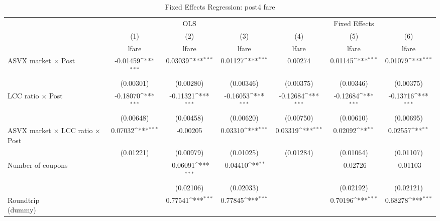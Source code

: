 \begin{table}[htbp]\centering
\def\sym#1{\ifmmode^{#1}\else\(^{#1}\)\fi}
\caption{Fixed Effects Regression: post4 fare \label{anyols\_post4\_fare}}
\begin{tabular}{l*{6}{c}}
\toprule
                    &\multicolumn{3}{c}{OLS}                                          &\multicolumn{3}{c}{Fixed Effects}                                \\\cmidrule(lr){2-4}\cmidrule(lr){5-7}
                    &\multicolumn{1}{c}{(1)}&\multicolumn{1}{c}{(2)}&\multicolumn{1}{c}{(3)}&\multicolumn{1}{c}{(4)}&\multicolumn{1}{c}{(5)}&\multicolumn{1}{c}{(6)}\\
                    &\multicolumn{1}{c}{lfare}&\multicolumn{1}{c}{lfare}&\multicolumn{1}{c}{lfare}&\multicolumn{1}{c}{lfare}&\multicolumn{1}{c}{lfare}&\multicolumn{1}{c}{lfare}\\
\midrule
ASVX market $\times$ Post&    -0.01459\sym{***}&     0.03039\sym{***}&     0.01127\sym{***}&     0.00274         &     0.01145\sym{***}&     0.01079\sym{***}\\
                    &   (0.00301)         &   (0.00280)         &   (0.00346)         &   (0.00375)         &   (0.00346)         &   (0.00375)         \\
\addlinespace
LCC ratio $\times$ Post&    -0.18070\sym{***}&    -0.11321\sym{***}&    -0.16053\sym{***}&    -0.12684\sym{***}&    -0.12684\sym{***}&    -0.13716\sym{***}\\
                    &   (0.00648)         &   (0.00458)         &   (0.00620)         &   (0.00750)         &   (0.00610)         &   (0.00695)         \\
\addlinespace
ASVX market $\times$ LCC ratio $\times$ Post&     0.07032\sym{***}&    -0.00205         &     0.03310\sym{***}&     0.03319\sym{***}&     0.02092\sym{**} &     0.02557\sym{**} \\
                    &   (0.01221)         &   (0.00979)         &   (0.01025)         &   (0.01284)         &   (0.01064)         &   (0.01107)         \\
\addlinespace
Number of coupons   &                     &    -0.06091\sym{***}&    -0.04410\sym{**} &                     &    -0.02726         &    -0.01103         \\
                    &                     &   (0.02106)         &   (0.02033)         &                     &   (0.02192)         &   (0.02121)         \\
\addlinespace
\shortstack{Roundtrip \\ (dummy)}&                     &     0.77541\sym{***}&     0.77845\sym{***}&                     &     0.70196\sym{***}&     0.68278\sym{***}\\

\end{tabular}
\end{table}
